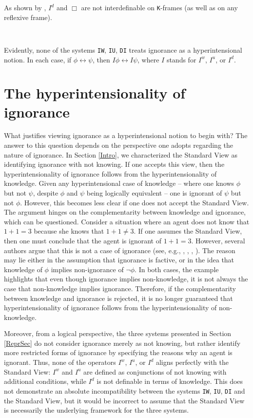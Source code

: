 \documentclass{article}
\begin{document}
As shown by \citet{Gilbert2021}, $I^{d}$ and $\Box$ are not interdefinable on \texttt{K}-frames (as well as on any reflexive frame). 

\

Evidently, none of the systems \texttt{IW}, \texttt{IU}, \texttt{DI} treats ignorance as a hyperintensional notion. In each case, if $\phi \leftrightarrow \psi$, then $I \phi \leftrightarrow I \psi$, where $I$ stands for $I^{w}$, $I^{u}$, or $I^{d}$.  

\section{The hyperintensionality of ignorance}
\label{FormalIgnoranceSection}

What justifies viewing ignorance as a hyperintensional notion to begin with? The answer to this question depends on the perspective one adopts regarding the nature of ignorance. In Section \ref{Intro}, we characterized the Standard View as identifying ignorance with not knowing. If one accepts this view, then the hyperintensionality of ignorance follows from the hyperintensionality of knowledge. Given any hyperintensional case of knowledge -- where one knows $\phi$ but not $\psi$, despite $\phi$ and $\psi$ being logically equivalent -- one is ignorant of $\psi$ but not $\phi$. However, this becomes less clear if one does not accept the Standard View. The argument hinges on the complementarity between knowledge and ignorance, which can be questioned. Consider a situation where an agent does not know that $1 + 1 = 3$ because she knows that $1 + 1 \not = 3$. If one assumes the Standard View, then one must conclude that the agent is ignorant of $1 + 1 = 3$. However, several authors argue that this is not a case of ignorance (see, e.g., \citet{vanWoudenberg2009}, \citet{Zimmerman2018}, \citet{Pritchard2021}, \citet{Peels2023}). The reason may lie either in the assumption that ignorance is factive, or in the idea that knowledge of $\phi$ implies non-ignorance of $\neg \phi$. In both cases, the example highlights that even though ignorance implies non-knowledge, it is not always the case that non-knowledge implies ignorance. Therefore, if the complementarity between knowledge and ignorance is rejected, it is no longer guaranteed that hyperintensionality of ignorance follows from the hyperintensionality of non-knowledge. 

Moreover, from a logical perspective, the three systems presented in Section \ref{ReprSec} do not consider ignorance merely as not knowing, but rather identify more restricted forms of ignorance by specifying the reasons why an agent is ignorant. Thus, none of the operators $I^{w}$, $I^{u}$, or $I^{d}$ aligns perfectly with the Standard View: $I^{w}$ and $I^{u}$ are defined as conjunctions of not knowing with additional conditions, while $I^{d}$ is not definable in terms of knowledge. This does not demonstrate an absolute incompatibility between the systems \texttt{IW}, \texttt{IU}, \texttt{DI} and the Standard View, but it would be incorrect to assume that the Standard View is necessarily the underlying framework for the three systems. 
\end{document}
